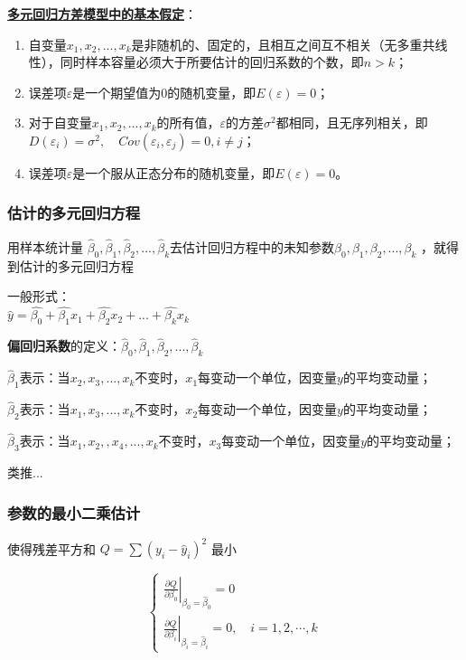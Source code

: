 \documentclass[UTF8,10pt]{book}
\begin{document}
\textbf{\underline{多元回归方差模型中的基本假定}}：

\begin{enumerate}
	\def\labelenumi{\arabic{enumi}.}
	\item
	自变量\(x_1,x_2,...,x_k\)是非随机的、固定的，且相互之间互不相关（无多重共线性），同时样本容量必须大于所要估计的回归系数的个数，即\(n>k\)；
	\item
	误差项\(\varepsilon\)是一个期望值为\(0\)的随机变量，即\(E(\varepsilon)=0\)；
	\item
	对于自变量\(x_1,x_2,...,x_k\)的所有值，\(\varepsilon\)的方差\(\sigma^2\)都相同，且无序列相关，即\(D(\varepsilon_i) = \sigma^2 ,\quad Cov(\varepsilon_i,\varepsilon_j)=0,i \neq j\)；
	\item
	误差项\(\varepsilon\)是一个服从正态分布的随机变量，即\(E(\varepsilon)=0\)。
\end{enumerate}

\subsubsection{估计的多元回归方程}\label{header-n159}

用样本统计量
\( \hat{\beta}_0,\hat{\beta}_1,\hat{\beta}_2,...,\hat{\beta}_k \)去估计回归方程中的未知参数\( \beta_0,\beta_1,\beta_2,...,\beta_k\)
，就得到估计的多元回归方程

一般形式：\\
\( \hat{y} = \hat{\beta_0} + \hat{\beta_1} x_1 + \hat{\beta_2} x_2 + ... + \hat{\beta_k} x_k \)

\textbf{偏回归系数}的定义：\( \hat{\beta}_0,\hat{\beta}_1,\hat{\beta}_2,...,\hat{\beta}_k \)

\(\hat{\beta}_1\)表示：当\( x_2,x_3,...,x_k\)不变时，\(x_1\)每变动一个单位，因变量\(y\)的平均变动量；

\(\hat{\beta}_2\)表示：当\( x_1,x_3,...,x_k\)不变时，\(x_2\)每变动一个单位，因变量\(y\)的平均变动量；

\(\hat{\beta}_3\)表示：当\( x_1,x_2,,x_4,...,x_k\)不变时，\(x_3\)每变动一个单位，因变量\(y\)的平均变动量；

类推...

\subsubsection{参数的最小二乘估计}\label{header-n167}

使得残差平方和 \(Q = \sum (y_i - \hat{y}_i)^2\) 最小

\[\left\{\begin{array}{l}
\left.\frac{\partial Q}{\partial \beta_{0}}\right|_{\beta_{0}=\hat{\beta}_{0}}=0 \\
\left.\frac{\partial Q}{\partial \beta_{i}}\right|_{\beta_{i}=\hat{\beta}_{i}}=0, \quad i=1,2, \cdots, k
\end{array}\right.\]
\end{document}
